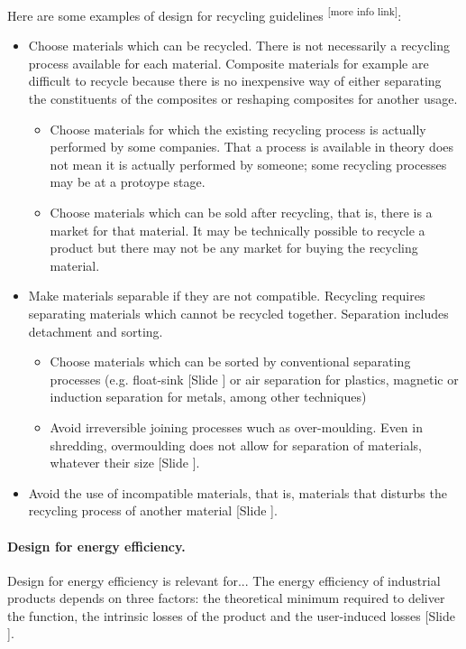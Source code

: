 \documentclass{article}
\newcounter{slide}
\begin{document}
Here are some examples of design for recycling guidelines {\color{red}\textsuperscript{[more info link]}}:
\begin{itemize}
	\item Choose materials which can be recycled. There is not necessarily a recycling process available for each material. Composite materials for example are difficult to recycle because there is no inexpensive way of either separating the constituents of the composites or reshaping composites for another usage. 
	\begin{itemize}
		\item Choose materials for which the existing recycling process is actually performed by some companies. That a process is available in theory does not mean it is actually performed by someone; some recycling processes may be at a protoype stage.
		\item Choose materials which can be sold after recycling, that is, there is a market for that material. It may be technically possible to recycle a product but there may not be any market for buying the recycling material. 
	\end{itemize}
	\item Make materials separable if they are not compatible. Recycling requires separating materials which cannot be recycled together. Separation includes detachment and sorting. 
	\begin{itemize}
		\item Choose materials which can be sorted by conventional separating processes (e.g. float-sink {\color{blue}[Slide ]} or air separation for plastics, magnetic or induction separation for metals, among other techniques)
	  \item Avoid irreversible joining processes wuch as over-moulding. Even in shredding, overmoulding does not allow for separation of materials, whatever their size {\color{blue}[Slide ]}.
	\end{itemize}
	\item Avoid the use of incompatible materials, that is, materials that disturbs the recycling process of another material {\color{blue}[Slide ]}.
\end{itemize}


\paragraph{Design for energy efficiency.}
\label{sec:DfEE}
Design for energy efficiency is relevant for...
The energy efficiency of industrial products depends on three factors: the theoretical minimum required to deliver the function, the intrinsic losses of the product and the user-induced losses \cite{eliasUserefficientDesignReducing2011} {\color{blue}[Slide ]}.
\end{document}
